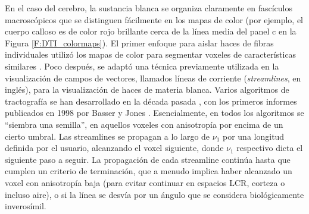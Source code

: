 En el caso del cerebro, la sustancia blanca se organiza claramente en fascículos macroscópicos que se distinguen fácilmente en los mapas de color (por ejemplo, el cuerpo calloso es de color rojo brillante cerca de la línea media del panel c en la Figura \ref{F:DTI_colormaps}). El primer enfoque para  aislar haces de fibras individuales utilizó los mapas de color para segmentar voxeles de características similares \cite{Makris_1997}. Poco después, se adaptó una técnica previamente utilizada en la visualización de campos de vectores, llamados líneas de corriente (\textit{streamlines}, en inglés), para la visualización de haces de materia blanca. Varios algoritmos de tractografía  se han desarrollado en la década pasada \cite{Mori_1999,Lazar_2003}, con los primeros informes publicados en 1998 por Basser \cite{Basser_1998} y Jones \cite{Jones_1998}. Esencialmente, en todos los algoritmos se ``siembra una semilla'', en aquellos voxeles con anisotropía por encima de un cierto umbral. Las streamlines se propagan a lo largo de $\nu_1$  por una longitud definida por el usuario, alcanzando el voxel siguiente, donde $\nu_1$ respectivo dicta el siguiente paso a seguir. La propagación de cada streamline continúa  hasta que cumplen un criterio de terminación, que a menudo implica haber alcanzado un voxel con anisotropía baja (para evitar continuar en espacios LCR, corteza o incluso aire), o si la línea se desvía por un ángulo que se considera biológicamente inverosímil.



